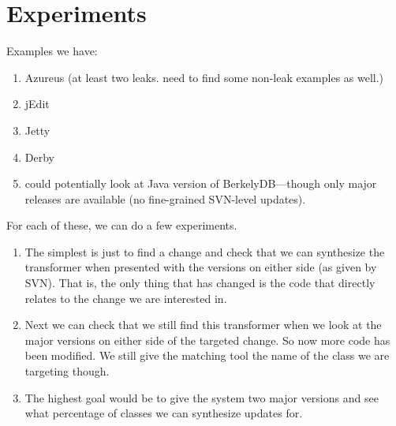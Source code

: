 \section{Experiments}

Examples we have:
\begin{enumerate}
\item Azureus (at least two leaks.  need to find some non-leak examples as well.)
\item jEdit
\item Jetty
\item Derby
\item could potentially look at Java version of BerkelyDB---though only major releases are available (no fine-grained SVN-level updates).
\end{enumerate}

For each of these, we can do a few experiments.

\begin{enumerate}
\item The simplest is just to find a change and check that we can
  synthesize the transformer when presented with the versions on
  either side (as given by SVN).  That is, the only thing that has
  changed is the code that directly relates to the change we are
  interested in.
\item Next we can check that we still find this transformer when we
  look at the major versions on either side of the targeted change.
  So now more code has been modified.  We still give the matching tool
  the name of the class we are targeting though.
\item The highest goal would be to give the system two major versions
  and see what percentage of classes we can synthesize updates for.
\end{enumerate}
